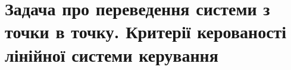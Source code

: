 \documentclass[a4paper, 12pt]{article}
\theoremstyle{definition}
\numberwithin{equation}{section}
\begin{document}
\setcounter{section}{2}
\section{Задача про переведення системи з точки в точку. Критерії керованості лінійної системи керування}






\end{document}
